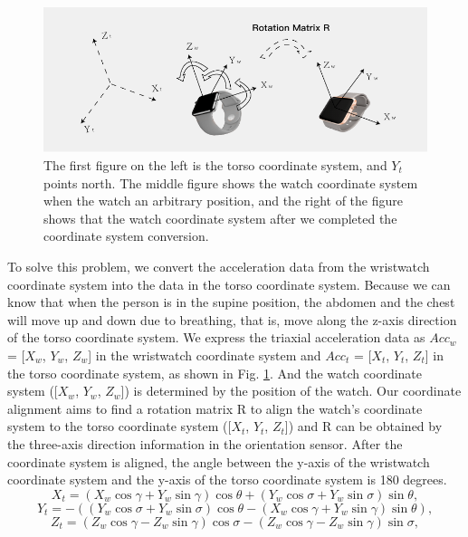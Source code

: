 \begin{figure}[!t]
\centering
      \includegraphics[width=0.67\linewidth]{Figures/watch.pdf}
  \caption{The first figure on the left is the torso coordinate system, and $Y_t$ points north. The middle figure shows the watch coordinate system when the watch an arbitrary position, and the right of the figure shows that the  watch coordinate system after we completed the coordinate system conversion.}\label{fig:watch}
\end{figure}

To solve this problem, we convert the acceleration data from the wristwatch coordinate system into the data in the torso coordinate system. Because we can know that when the person is in the supine position, the abdomen and the chest will move up and down due to breathing, that is, move along the z-axis direction of the torso coordinate system. We express the triaxial acceleration data as $Acc_w$ = [$X_w$, $Y_w$, $Z_w$] in the wristwatch coordinate system and $Acc_t$ = [$X_t$, $Y_t$, $Z_t$] in the torso coordinate system, as shown in Fig. \ref{fig:watch}. And the watch coordinate system ({[$X_w$, $Y_w$, $Z_w$]}) is determined by the position of the watch. Our coordinate alignment aims to find a rotation matrix R to align the watch's coordinate system to the torso coordinate system ({[$X_t$, $Y_t$, $Z_t$]}) and R can be obtained by the three-axis direction information in the orientation sensor. After the coordinate system is aligned, the angle between the y-axis of the wristwatch coordinate system and the y-axis of the torso coordinate system is 180 degrees.
\begin{equation}
      X_t  = (X_w {\cos\gamma} + Y_w{\sin\gamma}){\cos\theta} + (Y_w\cos\sigma + Y_w\sin\sigma)\sin\theta,
\end{equation}
\begin{equation}
      Y_t = -((Y_w\cos\sigma + Y_w\sin\sigma)\cos\theta - (X_w\cos\gamma + Y_w\sin\gamma)\sin\theta),
\end{equation}
\begin{equation}
      Z_t = (Z_w\cos\gamma - Z_w\sin\gamma)\cos\sigma - (Z_w\cos\gamma - Z_w\sin\gamma)\sin\sigma,
\end{equation}


